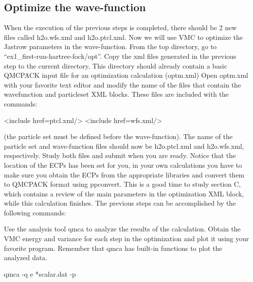 \subsection{Optimize the wave-function}
When the execution of the previous steps is completed, there should be 2 new
files called h2o.wfs.xml and h2o.ptcl.xml. Now we will use VMC to optimize the 
Jastrow parameters in the wave-function.  From the top directory, go to
``ex1\_first-run-hartree-fock/opt''. Copy the xml files generated in the previous step
to the current directory. This directory should already contain a basic QMCPACK input
file for an optimization calculation (optm.xml) %
Open optm.xml with your favorite text editor and modify the name of the files that contain the
wavefunction and particleset XML blocks. These files are included with the commands:
\begin{shade}
<include href=ptcl.xml/>
<include href=wfs.xml/>
\end{shade}
(the particle set must be
defined before the wave-function). The name of the particle set and wave-function files should now be h2o.ptcl.xml
and h2o.wfs.xml, respectively. Study both files and submit when you are ready. Notice that the
location of the ECPs has been set for you, in your own calculations you have to make
sure you obtain the ECPs from the appropriate libraries and convert them to QMCPACK
format using ppconvert. This is a good time to study section C, which contains a review
of the main parameters in the optimization XML block, while this calculation finishes. The
previous steps can be accomplished by the following commands:

Use the analysis tool qmca to analyze the results of the calculation. Obtain the VMC
energy and variance for each step in the optimization and plot it using your favorite program.
Remember that qmca has built-in functions to plot the analyzed data.
\begin{shade}
qmca -q e *scalar.dat -p
\end{shade}

